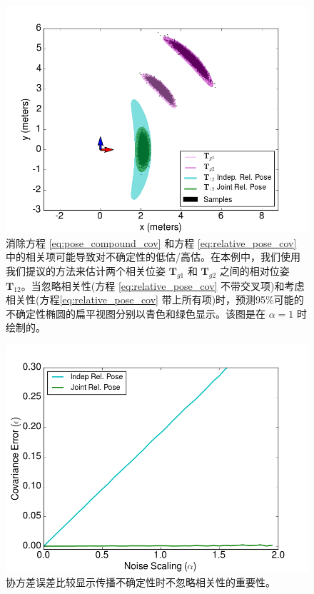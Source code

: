 \begin{figure}[t]
    \centering
    \includegraphics[width=\columnwidth]{figures/between_plot.png}
    \caption{消除方程 \eqref{eq:pose_compound_cov} 和方程 \eqref{eq:relative_pose_cov} 中的相关项可能导致对不确定性的低估/高估。在本例中，我们使用我们提议的方法来估计两个相关位姿 $\mathbf{T}_{g1}$ 和 $\mathbf{T}_{g2}$ 之间的相对位姿 $\mathbf{T}_{12}$。当忽略相关性(方程 \eqref{eq:relative_pose_cov} 不带交叉项)和考虑相关性(方程\eqref{eq:relative_pose_cov} 带上所有项)时，预测95\%可能的不确定性椭圆的扁平视图分别以青色和绿色显示。该图是在 $\alpha=1$ 时绘制的。}
    \label{fig:between}
\end{figure}

\begin{figure}[t]
    \centering
    \includegraphics[width=\columnwidth]{figures/between_covariance_error.png}
    \caption{协方差误差比较显示传播不确定性时不忽略相关性的重要性。}
    \label{fig:cov_error}
\end{figure}

